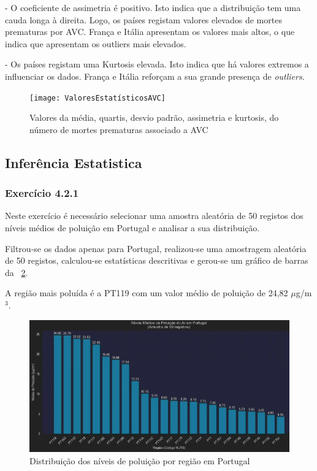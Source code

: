 \documentclass[conference]{IEEEtran}
\begin{document}
- O coeficiente de assimetria é positivo. Isto indica que a distribuição tem uma cauda longa à direita. Logo, os países registam valores elevados de mortes prematuras por AVC. França e Itália apresentam os valores mais altos, o que indica que apresentam os outliers mais elevados.

- Os países registam uma Kurtosis elevada. Isto indica que há valores extremos a influenciar os dados. França e Itália reforçam a sua grande presença de \textit{outliers}.



\begin{figure}
	\centering
	\texttt{[image: ValoresEstatísticosAVC]}
	\caption{Valores da média, quartis, desvio padrão, assimetria e kurtosis, do número de mortes prematuras associado a AVC}
	\label{fig:valoresestatisticos}
\end{figure}


\subsection{Inferência Estatistica}
\medskip
\subsubsection{\textbf{Exercício 4.2.1}}

Neste exercício é necessário selecionar uma amostra aleatória de 50 registos dos níveis médios de poluição em Portugal e analisar a sua distribuição.

Filtrou-se os dados apenas para Portugal, realizou-se uma amostragem aleatória de 50 registos, calculou-se estatísticas descritivas e gerou-se um gráfico de barras da \figurename~\ref{fig:polportugal}.

A região mais poluída é a PT119 com um valor médio de poluição de 24,82 $\mu$g/m$^3$.

\begin{figure}
	\centering
	\includegraphics[width=0.9\linewidth]{pol_portugal.png}
	\caption{Distribuição dos níveis de poluição por região em Portugal}
	\label{fig:polportugal}
\end{figure}
\end{document}

